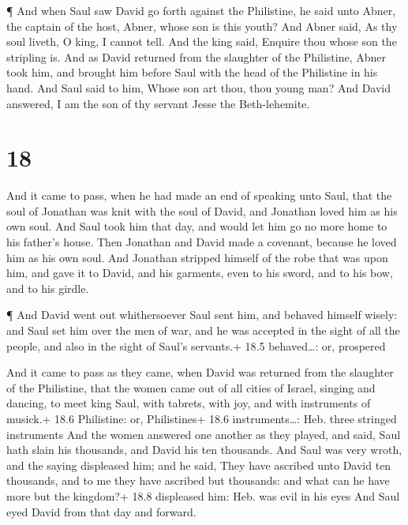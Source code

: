  ¶ And when Saul saw David go forth against the Philistine,
he said unto Abner, the captain of the host, Abner, whose son is this
youth? And Abner said, As thy soul liveth, O king, I cannot tell.
 And the king said, Enquire thou whose son the stripling
is.  And as David returned from the slaughter of the
Philistine, Abner took him, and brought him before Saul with the head of
the Philistine in his hand.  And Saul said to him, Whose
son art thou, thou young man? And David answered, I am the son of thy
servant Jesse the Beth-lehemite.

\hypertarget{section-17}{%
\section{18}\label{section-17}}

 And it came to pass, when he had made an end of speaking
unto Saul, that the soul of Jonathan was knit with the soul of David,
and Jonathan loved him as his own soul.  And Saul took him
that day, and would let him go no more home to his father's house.
 Then Jonathan and David made a covenant, because he loved
him as his own soul.  And Jonathan stripped himself of the
robe that was upon him, and gave it to David, and his garments, even to
his sword, and to his bow, and to his girdle.

 ¶ And David went out whithersoever Saul sent him, and
behaved himself wisely: and Saul set him over the men of war, and he was
accepted in the sight of all the people, and also in the sight of Saul's
servants.+ 18.5 behaved\ldots: or, prospered

 And it came to pass as they came, when David was returned
from the slaughter of the Philistine, that the women came out of all
cities of Israel, singing and dancing, to meet king Saul, with tabrets,
with joy, and with instruments of musick.+ 18.6 Philistine: or,
Philistines+ 18.6 instruments\ldots: Heb. three stringed instruments
 And the women answered one another as they played, and
said, Saul hath slain his thousands, and David his ten thousands.
 And Saul was very wroth, and the saying displeased him; and
he said, They have ascribed unto David ten thousands, and to me they
have ascribed but thousands: and what can he have more but the kingdom?+
18.8 displeased him: Heb. was evil in his eyes  And Saul
eyed David from that day and forward.

